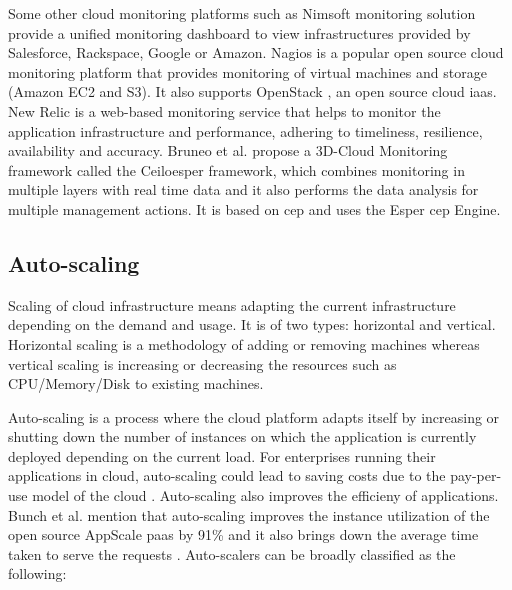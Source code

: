 \documentclass[article,type=msc,colorback,12pt,accentcolor=tud8b,table]{tudthesis}
\begin{document}
	Some other cloud monitoring platforms such as Nimsoft monitoring solution \cite{nimsoft} provide a unified monitoring dashboard to view infrastructures provided by Salesforce, Rackspace, Google or Amazon. Nagios \cite{nagios} is a popular open source cloud monitoring platform that provides monitoring of virtual machines and storage (Amazon EC2 and S3). It also supports OpenStack \cite{openstack}, an open source cloud \gls{iaas}. New Relic \cite{newrelic} is a web-based monitoring service that helps to monitor the application infrastructure and performance, adhering to timeliness, resilience, availability and accuracy. Bruneo et al. \cite{bruneo2015framework} propose a 3D-Cloud Monitoring framework called the Ceiloesper framework, which combines monitoring in multiple layers with real time data and it also performs the data analysis for multiple management actions. It is based on \gls{cep} and uses the Esper \gls{cep} Engine.	
	
	\subsection{Auto-scaling}	
	
	Scaling of cloud infrastructure means adapting the current infrastructure depending on the demand and usage. It is of two types: horizontal and vertical. Horizontal scaling is a methodology of adding or removing machines whereas vertical scaling is increasing or decreasing the resources such as CPU/Memory/Disk to existing machines.
	
	Auto-scaling is a process where the cloud platform adapts itself by increasing or shutting down the number of instances on which the application is currently deployed depending on the current load. For enterprises running their applications in cloud, auto-scaling could lead to saving costs due to the pay-per-use model of the cloud \cite{armbrust2010view}. Auto-scaling also improves the efficieny of applications. Bunch et al. mention that auto-scaling improves the instance utilization of the open source AppScale \gls{paas} by 91\% and it also brings down the average time taken to serve the requests \cite{bunch2012pluggable}. Auto-scalers can be broadly classified as the following: 
	
\end{document}
